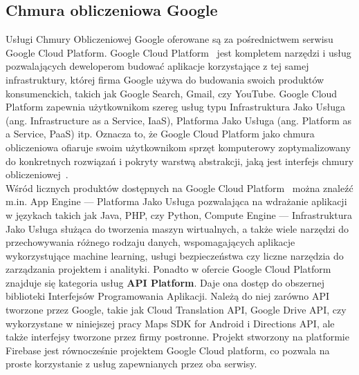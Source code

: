    \subsection{Chmura obliczeniowa Google}\label{google_cloud}
    \vspace{1cm}
    Usługi Chmury Obliczeniowej Google oferowane są za pośrednictwem serwisu Google Cloud Platform. Google Cloud Platform~\cite{GCP_OVERVIEW} jest kompletem narzędzi i usług pozwalających 
    deweloperom budować aplikacje korzystające z tej samej infrastruktury, której firma Google używa do budowania swoich produktów konsumenckich, takich jak Google Search, 
    Gmail, czy YouTube. Google Cloud Platform zapewnia użytkownikom szereg usług typu Infrastruktura Jako Usługa (ang. Infrastructure as a Service, IaaS), Platforma Jako 
    Usługa (ang. Platform as a Service, PaaS) itp. Oznacza to, że Google Cloud Platform jako chmura obliczeniowa ofiaruje swoim użytkownikom sprzęt komputerowy zoptymalizowany do konkretnych
    rozwiązań i pokryty warstwą abstrakcji, jaką jest interfejs chmury obliczeniowej~\cite{DEVHOST}.\\

    Wśród licznych produktów dostępnych na Google Cloud Platform~\cite{GCP_PRODUCTS} można znaleźć m.in. App Engine — Platforma Jako Usługa pozwalająca na wdrażanie aplikacji w językach
    takich jak Java, PHP, czy Python, Compute Engine — Infrastruktura Jako Usługa służąca do tworzenia maszyn wirtualnych, a także wiele narzędzi do przechowywania różnego rodzaju danych,
    wspomagających aplikacje wykorzystujące machine learning, usługi bezpieczeństwa czy liczne narzędzia do zarządzania projektem i analityki. Ponadto w ofercie Google Cloud Platform znajduje się
    kategoria usług \textbf{API Platform}. Daje ona dostęp do obszernej biblioteki Interfejsów Programowania Aplikacji. Należą do niej zarówno API tworzone przez Google, takie jak Cloud 
    Translation API, Google Drive API, czy wykorzystane w niniejszej pracy Maps SDK for Android i Directions API, ale także interfejsy tworzone przez firmy postronne.
    Projekt stworzony na platformie Firebase jest równocześnie projektem Google Cloud platform, co pozwala na proste korzystanie z usług zapewnianych przez oba serwisy. \\

